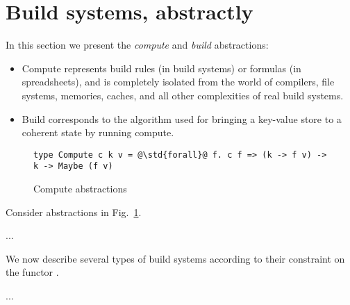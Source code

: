 \clearpage

\section{Build systems, abstractly}\label{sec-build-abstractions}

In this section we present the \emph{compute} and \emph{build} abstractions:
\begin{itemize}
    \item Compute represents build rules (in build systems) or formulas (in
    spreadsheets), and is completely isolated from the world of compilers, file
    systems, memories, caches, and all other complexities of real build systems.
    \item Build corresponds to the algorithm used for bringing a key-value store
    to a coherent state by running compute.
\end{itemize}

\begin{figure}
\begin{verbatim}
type Compute c k v = @\std{forall}@ f. c f => (k -> f v) -> k -> Maybe (f v)
\end{verbatim}
\caption{Compute abstractions}\label{fig-compute}
\end{figure}

Consider abstractions in Fig.~\ref{fig-compute}.

...

We now describe several types of build systems according to their constraint
on the functor .

...


